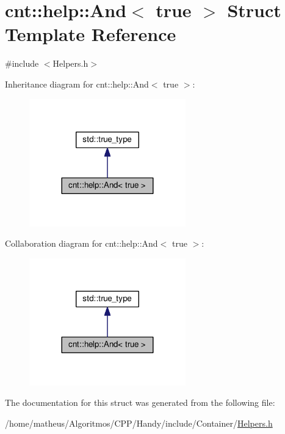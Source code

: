 \hypertarget{structcnt_1_1help_1_1And_3_01true_01_4}{}\section{cnt\+:\+:help\+:\+:And$<$ true $>$ Struct Template Reference}
\label{structcnt_1_1help_1_1And_3_01true_01_4}


{\ttfamily \#include $<$Helpers.\+h$>$}



Inheritance diagram for cnt\+:\+:help\+:\+:And$<$ true $>$\+:\nopagebreak
\begin{figure}[H]
\begin{center}
\leavevmode
\includegraphics[width=192pt]{structcnt_1_1help_1_1And_3_01true_01_4__inherit__graph}
\end{center}
\end{figure}


Collaboration diagram for cnt\+:\+:help\+:\+:And$<$ true $>$\+:\nopagebreak
\begin{figure}[H]
\begin{center}
\leavevmode
\includegraphics[width=192pt]{structcnt_1_1help_1_1And_3_01true_01_4__coll__graph}
\end{center}
\end{figure}


The documentation for this struct was generated from the following file\+:\begin{DoxyCompactItemize}
\item 
/home/matheus/\+Algoritmos/\+C\+P\+P/\+Handy/include/\+Container/\hyperlink{Container_2Helpers_8h}{Helpers.\+h}\end{DoxyCompactItemize}
